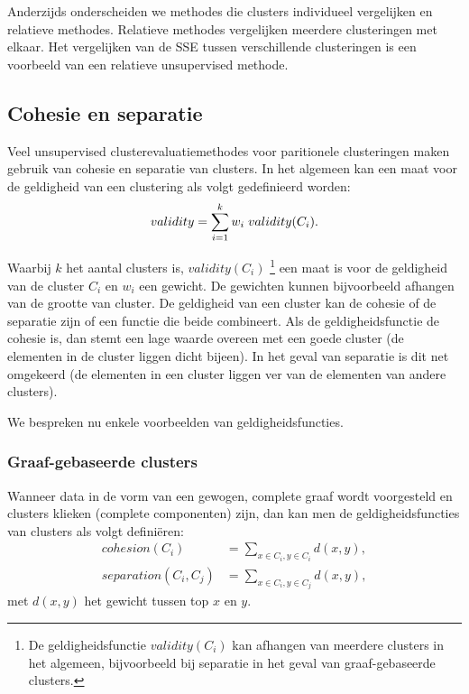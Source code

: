 \documentclass[a4paper,12pt]{article}
\theoremstyle{definition}
\begin{document}
Anderzijds onderscheiden we methodes die clusters individueel vergelijken en relatieve
me\-thodes. Relatieve methodes vergelijken meerdere clusteringen met elkaar.
Het vergelijken van de SSE tussen verschillende clusteringen is een voorbeeld van een 
relatieve unsupervised methode.

\subsection{Cohesie en separatie}
Veel unsupervised clusterevaluatiemethodes voor
paritionele clusteringen maken gebruik van cohesie en separatie van clusters.
In het algemeen kan een maat voor de geldigheid van een clustering als volgt
gedefinieerd worden:
$$validity = \sum\limits_{i=1}^kw_i\hspace{1mm} validity(C_i).$$

Waarbij $k$ het aantal clusters is,
$validity(C_i)$
\footnote{De geldigheidsfunctie $validity(C_i)$ kan afhangen van meerdere
clusters in het algemeen, bijvoorbeeld bij separatie in het geval van
graaf-gebaseerde clusters.} een maat is voor de geldigheid van de cluster $C_i$ en 
$w_i$ een gewicht. De gewichten kunnen bijvoorbeeld afhangen van de grootte van
cluster. De geldigheid van een cluster kan de cohesie of de separatie zijn of een
functie die beide combineert.
Als de geldigheidsfunctie de cohesie is, dan stemt een lage waarde overeen
met een goede cluster (de elementen in de cluster liggen dicht bijeen).
In het geval van separatie is dit net omgekeerd (de elementen in een cluster liggen
ver van de elementen van andere clusters).

We bespreken nu enkele voorbeelden van geldigheidsfuncties.

\subsubsection*{Graaf-gebaseerde clusters}
Wanneer data in de vorm van een gewogen, complete graaf wordt voorgesteld
en clusters klieken (complete componenten) zijn, dan kan men de geldigheidsfuncties
van clusters als volgt definiëren:
\begin{align*}
cohesion(C_i) &= \sum\limits_{x\in C_i, y\in C_i} d(x,y),\\
separation(C_i, C_j) &= \sum\limits_{x\in C_i, y\in C_j} d(x,y),
\end{align*}
met $d(x,y)$ het gewicht tussen top $x$ en $y$.
\end{document}
